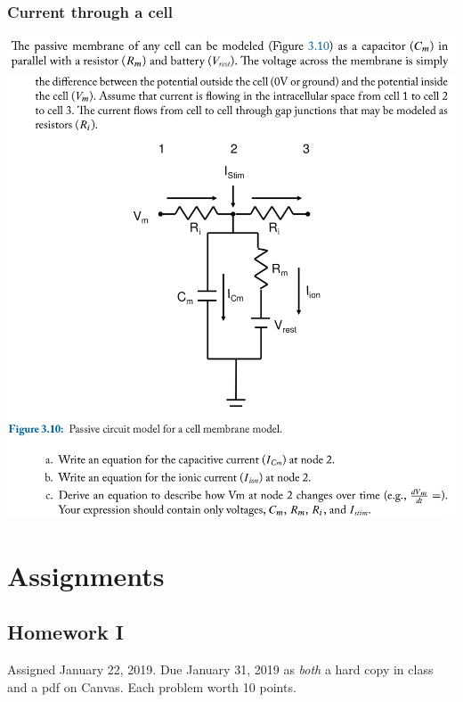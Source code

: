 \documentclass[11pt]{book}
\begin{document}
\section{Current through a cell}
\begin{center}
	\includegraphics[width=\textwidth]{figures/q3.17.png} \\
	\includegraphics[width=\textwidth]{figures/q3.18.png}
\end{center}

\newpage


\part{Assignments}
\chapter*{Homework I}
Assigned January 22, 2019. Due January 31, 2019 as \textit{both} a hard copy in class and a pdf on Canvas. Each problem worth 10 points.
\setcounter{chapter}{1}
\setcounter{section}{0}
\end{document}
